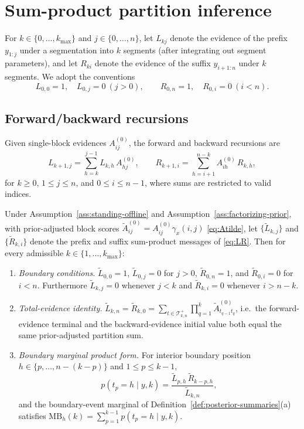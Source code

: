 \chapter{Sum-product partition inference}
\label{ch:sumproduct}
\label{app:marginals}

\label{sec:dp}

For $k\in\{0,\dots,k_{\max}\}$ and $j\in\{0,\dots,n\}$, let $L_{k j}$ denote the evidence of
the prefix $y_{1:j}$ under a segmentation into $k$ segments (after integrating out segment
parameters), and let $R_{k i}$ denote the evidence of the suffix $y_{i+1:n}$ under $k$
segments. We adopt the conventions
\[
L_{0,0}=1,\quad L_{0,j}=0\ (j>0),\qquad
R_{0,n}=1,\quad R_{0,i}=0\ (i<n).
\]

\section{Forward/backward recursions}
Given single-block evidences $A^{(0)}_{ij}$, the forward and backward recursions are
\begin{equation}
L_{k+1,j}
 = \sum_{h=k}^{j-1} L_{k,h}\,A^{(0)}_{h j},\qquad
R_{k+1,i}
 = \sum_{h=i+1}^{n-k} A^{(0)}_{i h}\,R_{k,h},
\label{eq:LR}
\end{equation}
for $k\ge0$, $1\le j\le n$, and $0\le i\le n-1$, where sums are restricted to valid indices.

\begin{proposition}
\label{prop:fb-duality}
Under Assumption~\ref{ass:standing-offline} and Assumption~\ref{ass:factorizing-prior}, with
prior-adjusted block scores $\widetilde A^{(0)}_{ij}=A^{(0)}_{ij}\gamma_x(i,j)$
\eqref{eq:Atilde}, let $\{\widetilde L_{k,j}\}$ and $\{\widetilde R_{k,i}\}$ denote the prefix and
suffix sum-product messages of \eqref{eq:LR}. Then for every admissible
$k\in\{1,\dots,k_{\max}\}$:
\begin{enumerate}[label=\textnormal{(\roman*)}]
\item \emph{Boundary conditions.}
$\widetilde L_{0,0}=1$, $\widetilde L_{0,j}=0$ for $j>0$, $\widetilde R_{0,n}=1$, and
$\widetilde R_{0,i}=0$ for $i<n$. Furthermore $\widetilde L_{k,j}=0$ whenever $j<k$ and
$\widetilde R_{k,i}=0$ whenever $i>n-k$.
\item \emph{Total-evidence identity.}
$\widetilde L_{k,n}=\widetilde R_{k,0}=\sum_{t\in\mathcal T_{k,n}^{+}}\prod_{q=1}^k \widetilde A^{(0)}_{t_{q-1}t_q}$,
i.e.\ the forward-evidence terminal and the backward-evidence initial value both equal the same
prior-adjusted partition sum.
\item \emph{Boundary marginal product form.}
For interior boundary position $h\in\{p,\dots,n-(k-p)\}$ and $1\le p\le k-1$,
\[
p(t_p=h\mid y,k)=\frac{\widetilde L_{p,h}\,\widetilde R_{k-p,h}}{\widetilde L_{k,n}},
\]
and the boundary-event marginal of Definition~\ref{def:posterior-summaries}(a) satisfies
$\mathrm{MB}_h(k)=\sum_{p=1}^{k-1}p(t_p=h\mid y,k)$.
\end{enumerate}
\end{proposition}

